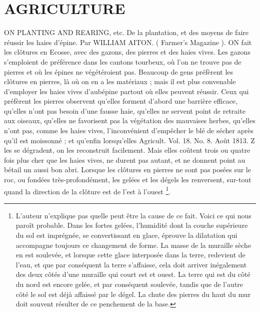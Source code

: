 \setcounter{page}{289} \section{AGRICULTURE}
ON PLANTING AND REARING, etc. De la plantation, et des moyens de faire réussir les haies d'épine. Par WILLIAM AITON. ( Farmer's Magazine ).
ON fait les clôtures en Ecosse, avec des gazons, des pierres et des haies vives. Les gazons s'emploient de préférence dans les cantons tourbeux, où l'on ne trouve pas de pierres et où les épines ne végétéroient pas. Beaucoup de gens préfèrent les clôtures en pierres, là où on en a les matériaux ; mais il est plus convenable d'employer les haies vives d'aubépine partout où elles peuvent réussir. Ceux qui préfèrent les pierres observent qu'elles forment d'abord une barrière efficace, qu'elles n'ont pas besoin d'une fausse haie, qu'elles ne servent point de retraite aux oiseaux, qu'elles ne favorisent pas la végétation des mauvaises herbes, qu'elles n'ont pas, comme les haies vives, l'inconvénient d'empêcher le blé de sécher après qu'il est moissonné ; et qu'enfin lorsqu'elles
Agricult. Vol. 18. No. 8. Août 1813. Z\setcounter{page}{290} les se dégradent, on les reconstruit facilement. Mais elles coûtent trois ou quatre fois plus cher que les haies vives, ne durent pas autant, et ne donnent point au bétail un aussi bon abri. Lorsque les clôtures en pierres ne sont pas posées sur le roc, ou fondées très-profondément, les gelées et les dégels les renversent, sur-tout quand la direction de la clôture est de l'est à l'ouest \footnote{L'auteur n'explique pas quelle peut être la cause de ce fait. Voici ce qui nous paroît probable. Dans les fortes gelées, l'humidité dont la couche supérieure du sol est imprégnée, se convertissant en glace, éprouve la dilatation qui accompagne toujours ce changement de forme. La masse de la muraille sèche en est soulevée, et lorsque cette glace interposée dans la terre, redevient de l'eau, et que par conséquent la terre s'affaisse, cela doit arriver inégalement des deux côtés d'une muraille qui court est et ouest. La terre qui est du côté du nord est encore gelée, et par conséquent soulevée, tandis que de l'autre côté le sol est déjà affaissé par le dégel. La chute des pierres du haut du mur doit souvent résulter de ce penchement de la base.}.
